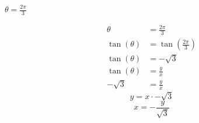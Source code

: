 \begin{problem}[81.]
    $\theta = \frac{2\pi}{3}$
\end{problem}

\begin{solution}
    \begin{align}
        \theta &= \frac{2\pi}{3} \\
        \tan(\theta) &= \tan \left( \frac{2\pi}{3} \right) \\
        \tan(\theta) &= -\sqrt{3} \\
        \tan(\theta) &= \frac{y}{x} \\
        -\sqrt{3} &= \frac{y}{x}
    \end{align}
    \[\boxed{y = x \cdot -\sqrt{3} }\]
    \[\boxed{x = -\frac{y}{\sqrt{3}}}\]
\end{solution}